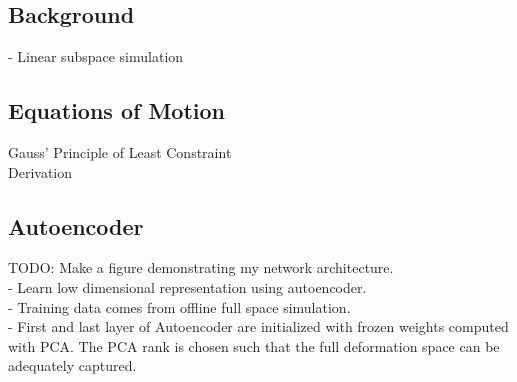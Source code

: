 \subsection{Background}
- Linear subspace simulation\\



\subsection{Equations of Motion}
Gauss' Principle of Least Constraint \\
Derivation\\

\subsection{Autoencoder}
TODO: Make a figure demonstrating my network architecture.\\


- Learn low dimensional representation using autoencoder.\\
- Training data comes from offline full space simulation.\\
- First and last layer of Autoencoder are initialized with frozen weights computed with PCA. The PCA rank is chosen such that the
full deformation space can be adequately captured.\\
